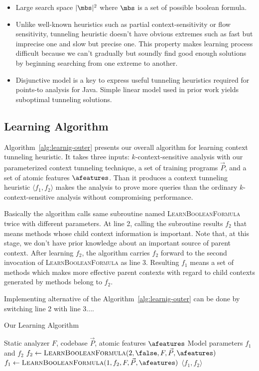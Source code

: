\begin{itemize}
	\item Large search space $|\mbs|^2$ where $\mbs$ is a set of possible
	boolean formula.
	\item Unlike well-known heuristics such as partial context-sensitivity or
	flow
	sensitivity, tunneling heuristic doesn't have obvious extremes such as
	fast
	but imprecise one and slow but precise one. This property makes
	learning
	process difficult because we can't gradually but soundly find good
	enough
	solutions by beginning searching from one extreme to another.
	\item Disjunctive model is a key to express useful tunneling heuristics
	required for points-to analysis for Java. Simple linear model used in prior
	work yields suboptimal tunneling solutions.
\end{itemize}
\subsection{Learning Algorithm}
Algorithm~\ref{alg:learnig-outer} presents our overall algorithm for learning context tunneling heuristic. It takes three inputs: $k$-context-sensitive analysis with our parameterized context tunneling technique, a set of training programs $\vec{P}$, and a set of atomic features $\afeatures$. Than it produces a context tunneling heuristic $\langle f_1, f_2 \rangle$ makes the analysis to prove more queries than the ordinary $k$-context-sensitive analysis without compromising performance.

Basically the algorithm calls same subroutine named \textsc{LearnBooleanFormula} twice with different parameters. At line 2, calling the subroutine results $f_2$ that means methods whose child context information is important. Note that, at this stage, we don't have prior knowledge about an important source of parent context. After learning $f_2$, the algorithm carries $f_2$ forward to the second invocation of \textsc{LearnBooleanFormula} as line 3. Resulting $f_1$ means a set of methods which makes more effective parent contexts with regard to child contexts generated by methods belong to $f_2$.

Implementing alternative of the Algorithm~\ref{alg:learnig-outer} can be done by switching line 2 with line 3....

\begin{algorithm}[b]
	\caption{Our Learning Algorithm}\label{alg:learnig-outer}
	\begin{algorithmic}[1]
		\Require Static analyzer $F$, codebase $\vec{P}$, atomic features $\afeatures$
		\Ensure Model parameters $f_1$ and $f_2$
		\State $f_2 \gets \textsc{LearnBooleanFormula}(2, \false, F, \vec{P}, \afeatures)$ 
		\State $f_1 \gets \textsc{LearnBooleanFormula}(1, f_2, F, \vec{P}, \afeatures)$ 
		\State \Return $\langle f_1, f_2 \rangle$
		\EndProcedure
	\end{algorithmic}
\end{algorithm}

